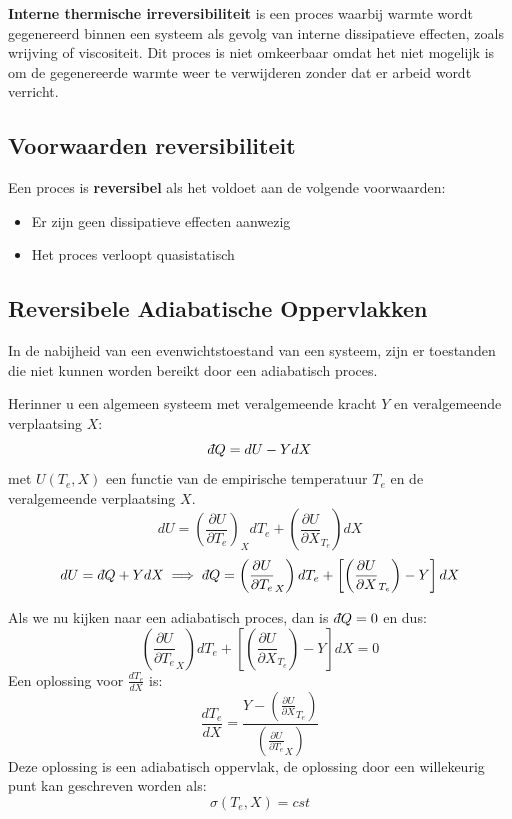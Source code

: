 \begin{definition}
    \textbf{Interne thermische irreversibiliteit} is een proces waarbij warmte wordt gegenereerd binnen een systeem als gevolg van interne dissipatieve effecten, zoals wrijving of viscositeit. 
    Dit proces is niet omkeerbaar omdat het niet mogelijk is om de gegenereerde warmte weer te verwijderen zonder dat er arbeid wordt verricht.
\end{definition}

\subsection{Voorwaarden reversibiliteit}

\begin{definition}[Reversibiliteit]
    Een proces is \textbf{reversibel} als het voldoet aan de volgende voorwaarden:
    \begin{itemize}
        \item Er zijn geen dissipatieve effecten aanwezig
        \item Het proces verloopt quasistatisch 
    \end{itemize}
\end{definition}

\subsection{Reversibele Adiabatische Oppervlakken}

\begin{postulate}
    In de nabijheid van een evenwichtstoestand van een systeem, zijn er toestanden die niet kunnen worden bereikt door een adiabatisch proces.
\end{postulate}

Herinner u een algemeen systeem met veralgemeende kracht \(Y\) en veralgemeende verplaatsing \(X\):
\[\dbar Q = dU -YdX\]
met \(U(T_e,X)\) een functie van de empirische temperatuur \(T_e\) en de veralgemeende verplaatsing \(X\).
\[
d U = \left(\frac{\partial U}{\partial T_e}\right)_X dT_e + \left(\frac{\partial U}{\partial X}_{T_e}\right) dX 
\]
\[
dU = \dbar Q + YdX \implies \dbar Q = \left(\frac{\partial U}{\partial T_e}_{X}\right) dT_e + \left[\left(\frac{\partial U}{\partial X}_{T_e}\right)  - Y\right]dX   
\]

Als we nu kijken naar een adiabatisch proces, dan is \(\dbar Q = 0\) en dus:
\[\left(\frac{\partial U}{\partial T_e}_{X}\right) dT_e + \left[\left(\frac{\partial U}{\partial X}_{T_e}\right)  - Y\right]dX = 0\]
Een oplossing voor \(\frac{dT_e}{dX}\) is:
\[\frac{dT_e}{dX} = \frac{Y - \left(\frac{\partial U}{\partial X}_{T_e}\right)}{\left(\frac{\partial U}{\partial T_e}_{X}\right)}\]
Deze oplossing is een adiabatisch oppervlak, de oplossing door een willekeurig punt kan geschreven worden als:
\[
\sigma (T_e ,X) = cst
\]

